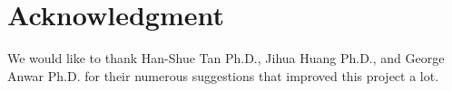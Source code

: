\section{Acknowledgment}\label{sec:ack}
We would like to thank Han-Shue Tan Ph.D., Jihua Huang Ph.D., and George Anwar Ph.D. for their numerous suggestions that improved this project a lot.
